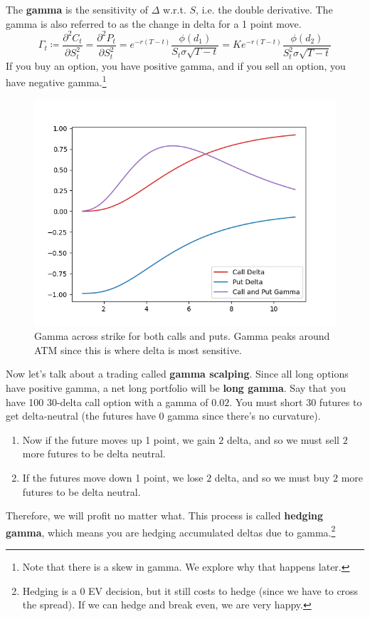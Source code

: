 \documentclass{article}
\begin{document}
    \begin{definition}[Gamma]
      The \textbf{gamma} is the sensitivity of $\Delta$ w.r.t. $S$, i.e. the double derivative. The gamma is also referred to as the change in delta for a 1 point move. 
      \begin{equation}
        \Gamma_t \coloneqq \frac{\partial^2 C_t }{\partial S_t^2} = \frac{\partial^2 P_t}{\partial S_t^2} = e^{-r(T - t)} \frac{\phi(d_1)}{S_t \sigma \sqrt{T - t}} = K e^{-r(T - t)} \frac{\phi(d_2)}{S_t^2 \sigma \sqrt{T - t}}
      \end{equation}
      If you buy an option, you have positive gamma, and if you sell an option, you have negative gamma.\footnote{Note that there is a skew in gamma. We explore why that happens later. }
      \begin{figure}[H]
        \centering 
        \includegraphics[scale=0.45]{img/gamma.png}
        \caption{Gamma across strike for both calls and puts. Gamma peaks around ATM since this is where delta is most sensitive. }
        \label{fig:gamma_across_strike}
      \end{figure}
    \end{definition}

    Now let's talk about a trading called \textbf{gamma scalping}. Since all long options have positive gamma, a net long portfolio will be \textbf{long gamma}. Say that you have 100 $30$-delta call option with a gamma of $0.02$. You must short $30$ futures to get delta-neutral (the futures have $0$ gamma since there's no curvature).

    \begin{enumerate}
      \item Now if the future moves up 1 point, we gain $2$ delta, and so we must sell $2$ more futures to be delta neutral.
      \item If the futures move down 1 point, we lose $2$ delta, and so we must buy $2$ more futures to be delta neutral.
    \end{enumerate}
    Therefore, we will profit no matter what. This process is called \textbf{hedging gamma}, which means you are hedging accumulated deltas due to gamma.\footnote{Hedging is a $0$ EV decision, but it still costs to hedge (since we have to cross the spread). If we can hedge and break even, we are very happy.}
\end{document}
